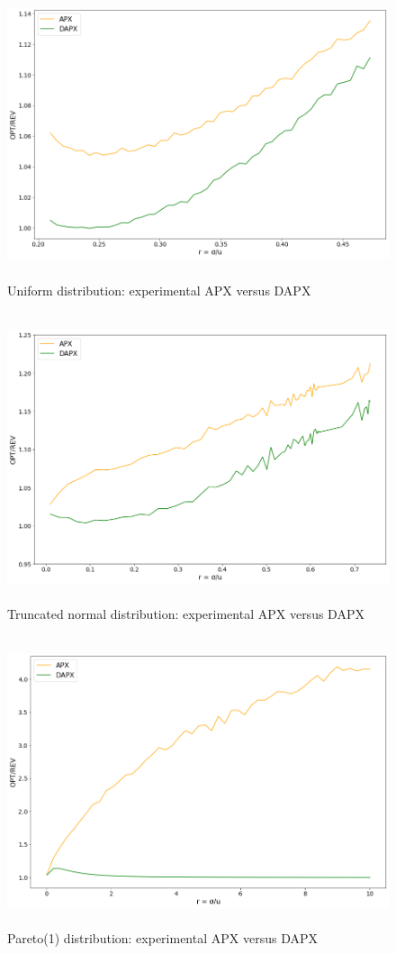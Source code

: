 \begin{figure}[H]
	\centering
	\includegraphics[width=1\textwidth, height=8.5cm]{apxuni.png}
	\caption{Uniform distribution: experimental APX versus DAPX}
	\label{fig:apxuni}
\end{figure}
\begin{figure}[H]
	\centering
	\includegraphics[width=1\textwidth,height=8.5cm]{apxtnorm.png}
	\caption{Truncated normal distribution: experimental APX versus DAPX}
	\label{fig:apxtnorm}
\end{figure}
\begin{figure}[H]
	\centering
	\includegraphics[width=1\textwidth,height=8.5cm]{apxpareto.png}
	\caption{Pareto(1) distribution: experimental APX versus DAPX}
	\label{fig:apxpareto}
\end{figure}
